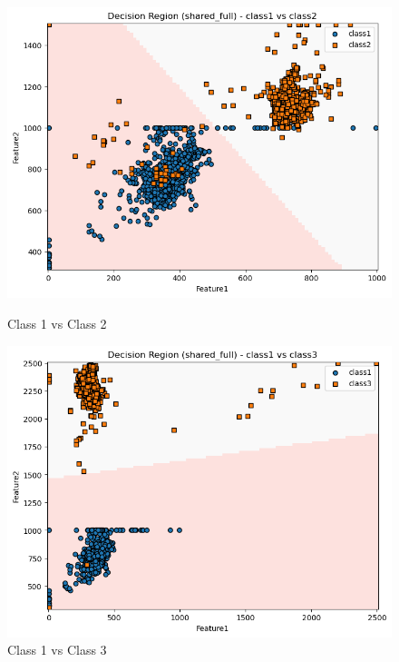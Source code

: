 \begin{figure}[H]
    \centering
    \begin{minipage}{0.32\linewidth}
        \includegraphics[width=\linewidth]{images/RD_Group04_images/02_shared_full/02_decision_region_c1_c2.png}
        \caption*{Class 1 vs Class 2}
    \end{minipage}
    \hfill
    \begin{minipage}{0.32\linewidth}
        \includegraphics[width=\linewidth]{images/RD_Group04_images/02_shared_full/03_decision_region_c1_c3.png}
        \caption*{Class 1 vs Class 3}
    \end{minipage}
    \hfill
    \begin{minipage}{0.32\linewidth}

\end{minipage}
\end{figure}
